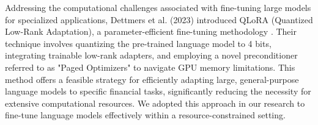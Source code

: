 \documentclass[logo,msc]{infthesis}           %
\begin{document}
Addressing the computational challenges associated with fine-tuning large models for specialized applications, Dettmers et al. (2023) introduced QLoRA (Quantized Low-Rank Adaptation), a parameter-efficient fine-tuning methodology \cite{dettmers2024qlora}. Their technique involves quantizing the pre-trained language model to 4 bits, integrating trainable low-rank adapters, and employing a novel preconditioner referred to as "Paged Optimizers" to navigate GPU memory limitations. This method offers a feasible strategy for efficiently adapting large, general-purpose language models to specific financial tasks, significantly reducing the necessity for extensive computational resources. We adopted this approach in our research to fine-tune language models effectively within a resource-constrained setting.
\end{document}
